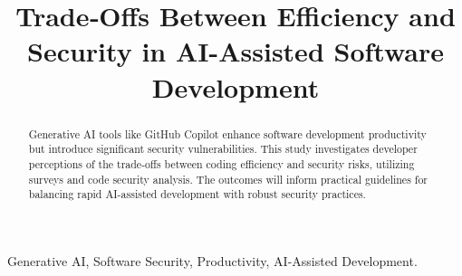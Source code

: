 \documentclass[conference]{IEEEtran} %
\begin{document}
\title{Trade‐Offs Between Efficiency and Security in AI-Assisted Software Development}

\author{
}

\maketitle

\begin{abstract}
Generative AI tools like GitHub Copilot enhance software development productivity but introduce significant security vulnerabilities. This study investigates developer perceptions of the trade-offs between coding efficiency and security risks, utilizing surveys and code security analysis. The outcomes will inform practical guidelines for balancing rapid AI-assisted development with robust security practices.
\end{abstract}

\begin{IEEEkeywords}
Generative AI, Software Security, Productivity, AI-Assisted Development.
\end{IEEEkeywords}

 








\begin{IEEEbiography}{}
\end{IEEEbiography}


\printbibliography
\end{document}
